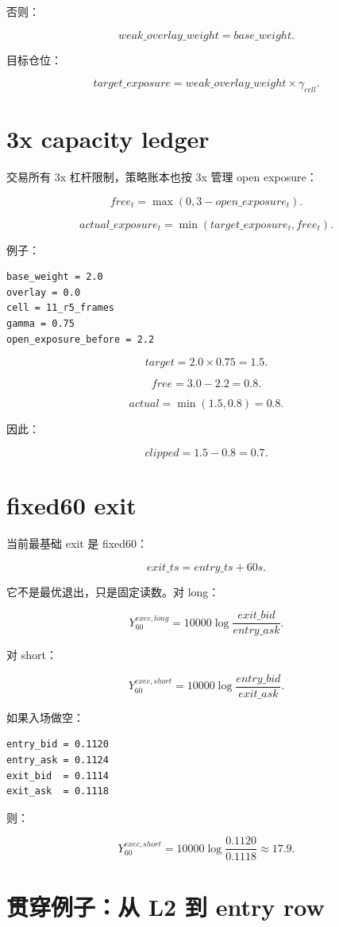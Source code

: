 否则：

\[
weak\_overlay\_weight=base\_weight.
\]

目标仓位：

\[
target\_exposure=weak\_overlay\_weight\times\gamma_{cell}.
\]

\section{3x capacity ledger}

交易所有 3x 杠杆限制，策略账本也按 3x 管理 open exposure：

\[
free_t=\max(0,3-open\_exposure_t).
\]

\[
actual\_exposure_t=\min(target\_exposure_t,free_t).
\]

例子：

\begin{lstlisting}
base_weight = 2.0
overlay = 0.0
cell = 11_r5_frames
gamma = 0.75
open_exposure_before = 2.2
\end{lstlisting}

\[
target=2.0\times0.75=1.5.
\]

\[
free=3.0-2.2=0.8.
\]

\[
actual=\min(1.5,0.8)=0.8.
\]

因此：

\[
clipped=1.5-0.8=0.7.
\]

\section{fixed60 exit}

当前最基础 exit 是 fixed60：

\[
exit\_ts = entry\_ts+60s.
\]

它不是最优退出，只是固定读数。对 long：

\[
Y^{exec,long}_{60}=10000\log\frac{exit\_bid}{entry\_ask}.
\]

对 short：

\[
Y^{exec,short}_{60}=10000\log\frac{entry\_bid}{exit\_ask}.
\]

如果入场做空：

\begin{lstlisting}
entry_bid = 0.1120
entry_ask = 0.1124
exit_bid  = 0.1114
exit_ask  = 0.1118
\end{lstlisting}

则：

\[
Y^{exec,short}_{60}
=10000\log\frac{0.1120}{0.1118}
\approx17.9.
\]

\section{贯穿例子：从 L2 到 entry row}

